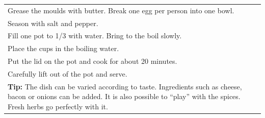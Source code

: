 \begin{tabular}{p{15cm}}
	\\
  Grease the moulds with butter. Break one egg per person into one bowl.\\
  Season with salt and pepper.\\
  Fill one pot to 1/3 with water. Bring to the boil slowly.\\
  Place the cups in the boiling water.\\
  Put the lid on the pot and cook for about 20 minutes.\\
  Carefully lift out of the pot and serve.\\
  \textbf{Tip:} The dish can be varied according to taste. Ingredients such as cheese, bacon or onions can be added. It is also possible to “play” with the spices. Fresh herbs go perfectly with it.
\end{tabular}
